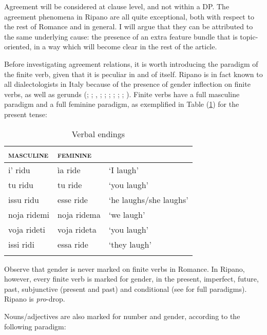 \documentclass[output=paper
,modfonts
,nonflat]{langsci/langscibook}
\begin{document}
\noindent Agreement will be considered at clause level, and not within a DP. The agreement phenomena in Ripano are all quite exceptional, both with respect to the rest of Romance and in general. I will argue that they can be attributed to the same underlying cause: the presence of an extra feature bundle that is topic-oriented, in a way which will become clear in the rest of the article.

Before investigating agreement relations, it is worth introducing the paradigm of the finite verb, given that it is peculiar in and of itself. Ripano is in fact known to all dialectologists in Italy because of the presence of gender inflection on finite verbs, as well as gerunds (\citealt{Egidi1965}; \citealt{Parrino1967}; \citealt{Luedtke1976}, \citealt{Mancini1988/1997}; \citealt{Mancini1993}; \citealt{Harder1998}; \citealt{Jones2001}; \citealt{Ledgeway2006}; \citealt{Rossi2008}; \citealt{Ferrari_Bridgers2010}). Finite verbs have a full masculine paradigm and a full feminine paradigm, as exemplified in Table (\ref{tab-dalessandro:1}) for the present tense:

\begin{table}
	\caption{Verbal endings \citep[31]{Rossi2008}}
	\label{tab-dalessandro:1}
\begin{tabularx}{\textwidth}{XXX}  
	\lsptoprule
\textsc{masculine} & \textsc{feminine} &\\
	\midrule	
i’ ridu & ìa ride & `I laugh'\\     	
tu ridu & tu ride &   `you laugh' \\   	
issu ridu  & esse ride & `he laughs/she laughs'\\  
noja ridemi & noja ridema & `we laugh'\\   	
voja rideti  & voja rideta &  `you laugh' \\  	
issi ridi  & essa ride &  `they laugh'   \\
	\lspbottomrule
\end{tabularx}
\end{table}
\noindent Observe that gender is never marked on finite verbs in Romance. In Ripano, however, every finite verb is marked for gender, in the present, imperfect, future, past, subjunctive (present and past) and conditional (see \citealt{Rossi2008} for full paradigms). Ripano is \textit{pro}-drop.

Nouns/adjectives are also marked for number and gender, according to the following paradigm:
\end{document}
